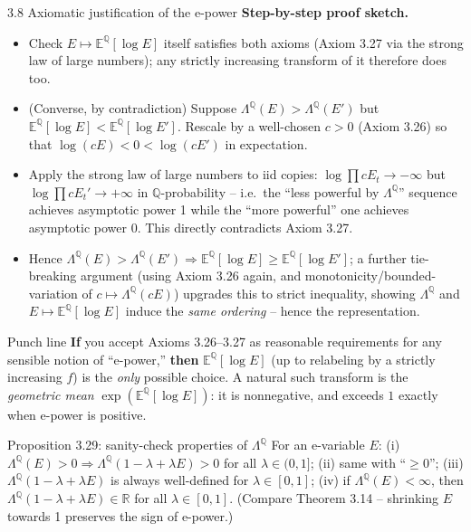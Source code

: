 \documentclass[aspectratio=169,10pt]{beamer}
\newcommand{\QQ}{\mathbb{Q}}
\newcommand{\EE}{\mathbb{E}}
\newcommand{\RR}{\mathbb{R}}
\begin{document}
\begin{frame}[allowframebreaks]{3.8 Axiomatic justification of the e-power}
  \textbf{Step-by-step proof sketch.}
  \begin{itemize}
    \item[\textbf{Step 1.}] Check $E\mapsto\EE^\QQ[\log E]$ itself satisfies both axioms (Axiom 3.27 via the strong law of large numbers); any strictly increasing transform of it therefore does too.
    \item[\textbf{Step 2.}] (Converse, by contradiction) Suppose $\Lambda^\QQ(E)>\Lambda^\QQ(E')$ but $\EE^\QQ[\log E]<\EE^\QQ[\log E']$. Rescale by a well-chosen $c>0$ (Axiom 3.26) so that $\log(cE)<0<\log(cE')$ in expectation.
    \item[\textbf{Step 3.}] Apply the strong law of large numbers to iid copies: $\log\prod cE_t\to-\infty$ but $\log\prod cE_t'\to+\infty$ in $\QQ$-probability -- i.e.\ the ``less powerful by $\Lambda^\QQ$'' sequence achieves asymptotic power 1 while the ``more powerful'' one achieves asymptotic power 0. This directly contradicts Axiom 3.27.
    \item[\textbf{Step 4.}] Hence $\Lambda^\QQ(E)>\Lambda^\QQ(E') \Rightarrow \EE^\QQ[\log E]\ge \EE^\QQ[\log E']$; a further tie-breaking argument (using Axiom 3.26 again, and monotonicity/bounded-variation of $c\mapsto\Lambda^\QQ(cE)$) upgrades this to strict inequality, showing $\Lambda^\QQ$ and $E\mapsto\EE^\QQ[\log E]$ induce the \emph{same ordering} -- hence the representation.
  \end{itemize}

  \begin{block}{Punch line}
    \textbf{If} you accept Axioms 3.26--3.27 as reasonable requirements for any sensible notion of ``e-power,'' \textbf{then} $\EE^\QQ[\log E]$ (up to relabeling by a strictly increasing $f$) is the \emph{only} possible choice. A natural such transform is the \emph{geometric mean} $\exp(\EE^\QQ[\log E])$: it is nonnegative, and exceeds $1$ exactly when e-power is positive.
  \end{block}

  \begin{block}{Proposition 3.29: sanity-check properties of $\Lambda^\QQ$}
    For an e-variable $E$: (i) $\Lambda^\QQ(E)>0 \Rightarrow \Lambda^\QQ(1-\lambda+\lambda E)>0$ for all $\lambda\in(0,1]$; (ii) same with ``$\ge 0$''; (iii) $\Lambda^\QQ(1-\lambda+\lambda E)$ is always well-defined for $\lambda\in[0,1]$; (iv) if $\Lambda^\QQ(E)<\infty$, then $\Lambda^\QQ(1-\lambda+\lambda E)\in\RR$ for all $\lambda\in[0,1]$. (Compare Theorem 3.14 -- shrinking $E$ towards 1 preserves the sign of e-power.)
  \end{block}
\end{frame}
\end{document}
